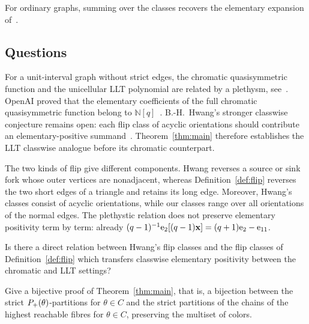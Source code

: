 For ordinary graphs, summing over the classes recovers the elementary expansion
of~\cite[Thm.~3.17]{DolegaKowalski2021x}.

\subsection{Questions}

For a unit-interval graph without strict edges, the chromatic quasisymmetric
function and the unicellular LLT polynomial are related by a
plethysm, see~\cite[Lem.~6.17]{AlexanderssonSulzgruber2022}.
OpenAI proved that the elementary coefficients of the full chromatic
quasisymmetric function belong to
$\mathbb{N}[q]$~\cite[Thm.~1.1]{OpenAI2026}.
B.-H.~Hwang's stronger classwise conjecture remains open: each flip class of
acyclic orientations should contribute an elementary-positive
summand~\cite[Conj.~3.10]{Hwang2022x}.
Theorem~\ref{thm:main} therefore establishes the LLT classwise analogue before
its chromatic counterpart.

The two kinds of flip give different components.
Hwang reverses a source or sink fork whose outer vertices are nonadjacent,
whereas Definition~\ref{def:flip} reverses the two short edges of a triangle and
retains its long edge.
Moreover, Hwang's classes consist of acyclic orientations, while our classes
range over all orientations of the normal edges.
The plethystic relation does not preserve elementary positivity term by term:
already $(q-1)^{-1}\mathrm{e}_2[(q-1)\mathbf{x}]=(q+1)\mathrm{e}_2-\mathrm{e}_{11}$.

\begin{question}
Is there a direct relation between Hwang's flip classes and the flip classes of
Definition~\ref{def:flip} which transfers classwise elementary positivity
between the chromatic and LLT settings?
\end{question}

\begin{question}
Give a bijective proof of Theorem~\ref{thm:main}, that is, a bijection between the
strict $P_{+}(\theta)$-partitions for $\theta\in C$ and the strict partitions of the
chains of the highest reachable fibres for $\theta\in C$, preserving the multiset of
colors.
\end{question}
